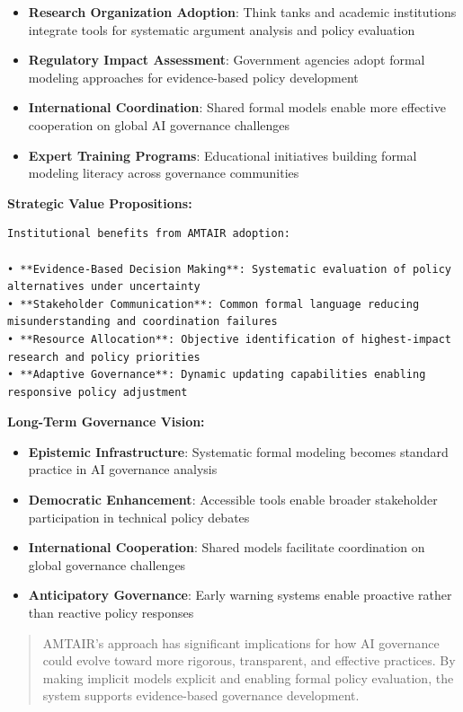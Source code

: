 \documentclass[
  11pt,
  letterpaper,
]{book}
\providecommand{\tightlist}{%
  \setlength{\itemsep}{0pt}\setlength{\parskip}{0pt}}
\begin{document}
\begin{itemize}
\tightlist
\item
  \textbf{Research Organization Adoption}: Think tanks and academic
  institutions integrate tools for systematic argument analysis and
  policy evaluation
\item
  \textbf{Regulatory Impact Assessment}: Government agencies adopt
  formal modeling approaches for evidence-based policy development
\item
  \textbf{International Coordination}: Shared formal models enable more
  effective cooperation on global AI governance challenges
\item
  \textbf{Expert Training Programs}: Educational initiatives building
  formal modeling literacy across governance communities
\end{itemize}

\textbf{Strategic Value Propositions:}

\begin{verbatim}
Institutional benefits from AMTAIR adoption:

• **Evidence-Based Decision Making**: Systematic evaluation of policy alternatives under uncertainty
• **Stakeholder Communication**: Common formal language reducing misunderstanding and coordination failures  
• **Resource Allocation**: Objective identification of highest-impact research and policy priorities
• **Adaptive Governance**: Dynamic updating capabilities enabling responsive policy adjustment
\end{verbatim}

\textbf{Long-Term Governance Vision:}

\begin{itemize}
\tightlist
\item
  \textbf{Epistemic Infrastructure}: Systematic formal modeling becomes
  standard practice in AI governance analysis
\item
  \textbf{Democratic Enhancement}: Accessible tools enable broader
  stakeholder participation in technical policy debates
\item
  \textbf{International Cooperation}: Shared models facilitate
  coordination on global governance challenges
\item
  \textbf{Anticipatory Governance}: Early warning systems enable
  proactive rather than reactive policy responses
\end{itemize}

\begin{quote}
AMTAIR's approach has significant implications for how AI governance
could evolve toward more rigorous, transparent, and effective practices.
By making implicit models explicit and enabling formal policy
evaluation, the system supports evidence-based governance development.
\end{quote}
\end{document}
